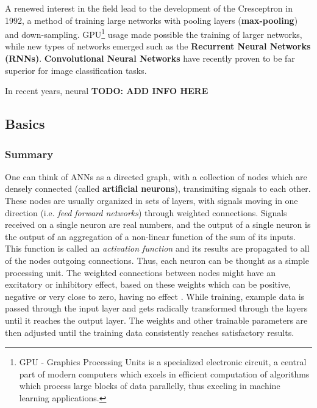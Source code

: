 A renewed interest in the field lead to the development of the
Cresceptron \cite{article:Cresceptron} in 1992, a method of training
large networks with pooling layers (\textbf{max-pooling}) and down-sampling.
GPU\footnote{GPU - Graphics Processing Units is a specialized
electronic circuit, a central part of modern computers which excels in
    efficient computation of algorithms which process large blocks of data
    parallelly, thus exceling in machine learning applications.} usage made
    possible the training of larger networks, while new types of networks
    emerged such as the \textbf{Recurrent Neural Networks (RNNs)}.
    \textbf{Convolutional Neural Networks} have recently proven to be
    far superior for image classification tasks.

    In recent years, neural
    \textbf{TODO: ADD INFO HERE}


    \subsection{Basics}
    \subsubsection{Summary}

    One can think of ANNs as a directed graph, with a collection of nodes
    which are densely connected (called \textbf{artificial neurons}),
    transimiting signals to each other. These nodes are usually organized
    in sets of layers, with signals moving in one direction
    (i.e. \textit{feed forward networks}) through weighted connections.
    Signals received on a single neuron are real numbers, and the output
    of a single neuron is the output of an aggregation of a non-linear
    function of the sum of its inputs. This function is called an
    \textit{activation function} and its results are propagated to all of
    the nodes outgoing connections.  Thus, each neuron can be thought as a
    simple processing unit. The weighted connections between nodes might
    have an excitatory or inhibitory effect, based on these weights which
    can be positive, negative or very close to zero, having no effect
    \cite[Chap. ~ 1]{book:Gurney1997AnIT}. While training, example
    data is passed through the input layer and gets radically transformed
    through the layers until it reaches the output layer. The weights and
    other trainable parameters are then adjusted until the training data
    consistently reaches satisfactory results.

